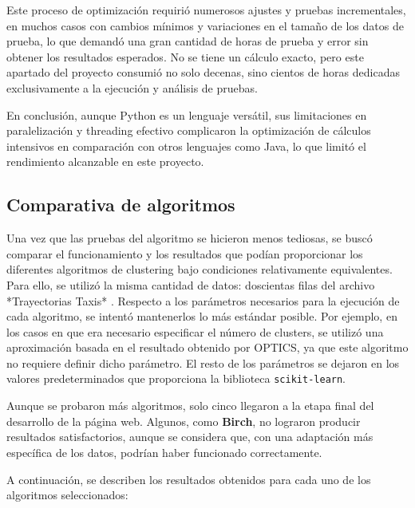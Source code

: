 Este proceso de optimización requirió numerosos ajustes y pruebas incrementales, en muchos casos con cambios mínimos y variaciones en el tamaño de los datos de prueba, lo que demandó una gran cantidad de horas de prueba y error sin obtener los resultados esperados. No se tiene un cálculo exacto, pero este apartado del proyecto consumió no solo decenas, sino cientos de horas dedicadas exclusivamente a la ejecución y análisis de pruebas.

En conclusión, aunque Python es un lenguaje versátil, sus limitaciones en paralelización y threading efectivo complicaron la optimización de cálculos intensivos en comparación con otros lenguajes como Java, lo que limitó el rendimiento alcanzable en este proyecto.


\subsection{Comparativa de algoritmos}

Una vez que las pruebas del algoritmo se hicieron menos tediosas, se buscó comparar el funcionamiento y los resultados que podían proporcionar los diferentes algoritmos de clustering bajo condiciones relativamente equivalentes. Para ello, se utilizó la misma cantidad de datos: doscientas filas del archivo *Trayectorias Taxis* \cite{trayectorias_taxis}. Respecto a los parámetros necesarios para la ejecución de cada algoritmo, se intentó mantenerlos lo más estándar posible. Por ejemplo, en los casos en que era necesario especificar el número de clusters, se utilizó una aproximación basada en el resultado obtenido por OPTICS, ya que este algoritmo no requiere definir dicho parámetro. El resto de los parámetros se dejaron en los valores predeterminados que proporciona la biblioteca \texttt{scikit-learn}.

Aunque se probaron más algoritmos, solo cinco llegaron a la etapa final del desarrollo de la página web. Algunos, como \textbf{Birch}, no lograron producir resultados satisfactorios, aunque se considera que, con una adaptación más específica de los datos, podrían haber funcionado correctamente.

A continuación, se describen los resultados obtenidos para cada uno de los algoritmos seleccionados:

